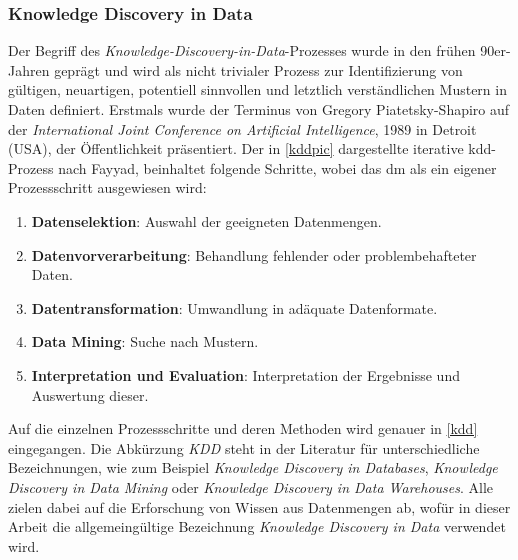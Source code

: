 \subsubsection{Knowledge Discovery in Data}
\label{dmkdd}

Der Begriff des \textit{Knowledge-Discovery-in-Data}-Prozesses wurde in den frühen 90er-Jahren geprägt und wird als \glqq nicht trivialer Prozess zur Identifizierung von gültigen, neuartigen, potentiell sinnvollen und letztlich verständlichen Mustern in Daten\grqq{} definiert. Erstmals wurde der Terminus von Gregory Piatetsky-Shapiro auf der \textit{International Joint Conference on Artificial Intelligence}, 1989 in Detroit (USA), der Öffentlichkeit präsentiert. Der in \vref{kddpic} dargestellte iterative \gls{kdd}-Prozess nach Fayyad, beinhaltet folgende Schritte, wobei das \gls{dm} als ein eigener Prozessschritt ausgewiesen wird:

\begin{enumerate}

\item \textbf{Datenselektion}: Auswahl der geeigneten Datenmengen.
\item \textbf{Datenvorverarbeitung}: Behandlung fehlender oder problembehafteter Daten.
\item \textbf{Datentransformation}: Umwandlung in adäquate Datenformate.
\item \textbf{Data Mining}: Suche nach Mustern.
\item \textbf{Interpretation und Evaluation}: Interpretation der Ergebnisse und Auswertung dieser.

\end{enumerate}

Auf die einzelnen Prozessschritte und deren Methoden wird genauer in \vref{kdd} eingegangen. Die Abkürzung \textit{KDD} steht in der Literatur für unterschiedliche Bezeichnungen, wie zum Beispiel \textit{Knowledge Discovery in Databases}, \textit{Knowledge Discovery in Data Mining} oder \textit{Knowledge Discovery in Data Warehouses}. Alle zielen dabei auf die Erforschung von Wissen aus Datenmengen ab, wofür in dieser Arbeit die allgemeingültige Bezeichnung \textit{Knowledge Discovery in Data} verwendet wird.

